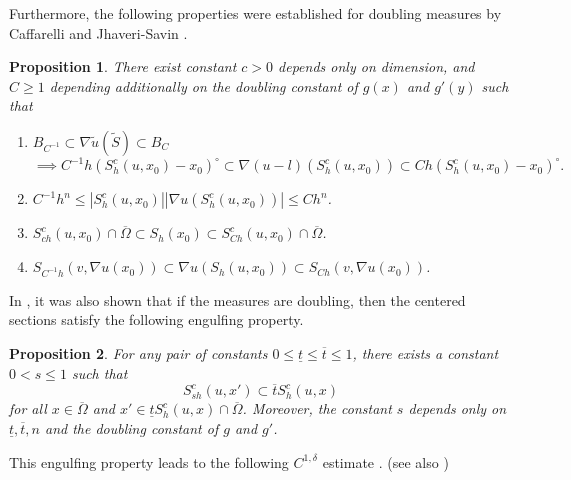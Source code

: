 \documentclass[10pt,a4paper]{amsart}
\newtheorem{prop}{Proposition}[section]
\numberwithin{equation}{section}
\begin{document}
Furthermore, the following properties were established for doubling measures by Caffarelli \cite{Caffarelli2, Caffarelli3} and Jhaveri-Savin \cite{Jhaveri-Savin}. 


\begin{prop}\label{prop: properties-of-sections}\cite[Section 3]{Jhaveri-Savin}
There exist constant $c>0$ depends only on dimension, and $C\geq 1$ depending additionally on the doubling constant of $g(x)$ and $g'(y)$ such that
\begin{enumerate}
    \item $B_{C^{-1}}\subset \nabla\tilde u(\tilde S)\subset B_C$
    \[\implies C^{-1}h(S_h^c(u, x_0)-x_0)^{\circ}\subset \nabla (u-l)(S_h^c(u, x_0))\subset Ch(S_h^c(u, x_0)-x_0)^{\circ}.\]
    \item $C^{-1}h^n\leq|S_h^c(u, x_0)||\nabla u(S_h^c(u, x_0))|\leq Ch^n$. 
    \item $S_{ch}^c(u, x_0)\cap \overline\Omega\subset S_h(x_0)\subset S_{Ch}^c(u, x_0)\cap \overline\Omega$. 
    \item $S_{C^{-1}h}(v, \nabla u(x_0))\subset \nabla u(S_h(u, x_0))\subset S_{Ch}(v, \nabla u(x_0))$. 
\end{enumerate}
\end{prop}

In \cite{Caffarelli3, Jhaveri-Savin}, it was also shown that if the measures are doubling, then the centered sections satisfy the following engulfing property. 
\begin{prop}\cite[Lemma 3.3]{Jhaveri-Savin}\label{prop: engulfing}
For any pair of constants $0\leq \underline{t}\leq \overline t\leq 1$, there exists a constant $0<s\leq 1$ such that
\[S_{sh}^c(u, x')\subset \overline tS_h^c(u, x)\]
for all $x\in \overline\Omega$ and $x'\in \underline{t}S_h^c(u, x)\cap \overline\Omega$. Moreover, the constant $s$ depends only on $\underline{t}, \overline t, n$ and the doubling constant of $g$ and $g'$.
\end{prop}

This engulfing property leads to the following $C^{1, \delta}$ estimate \cite{Caffarelli2, Jhaveri-Savin}. (see also \cite{Savin-Yu})    
\end{document}
